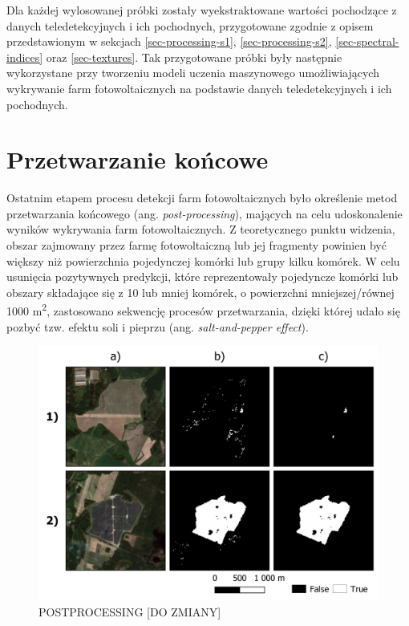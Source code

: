 \documentclass{amuthesis}
\begin{document}
Dla każdej wylosowanej próbki zostały wyekstraktowane wartości
pochodzące z danych teledetekcyjnych i ich pochodnych, przygotowane
zgodnie z opisem przedstawionym w sekcjach \ref{sec-processing-s1},
\ref{sec-processing-s2}, \ref{sec-spectral-indices} oraz
\ref{sec-textures}. Tak przygotowane próbki były następnie wykorzystane
przy tworzeniu modeli uczenia maszynowego umożliwiających wykrywanie
farm fotowoltaicznych na podstawie danych teledetekcyjnych i ich
pochodnych.

\hypertarget{przetwarzanie-koux144cowe}{%
\section{Przetwarzanie końcowe}\label{przetwarzanie-koux144cowe}}

Ostatnim etapem procesu detekcji farm fotowoltaicznych było określenie
metod przetwarzania końcowego (ang. \emph{post-processing}), mających na
celu udoskonalenie wyników wykrywania farm fotowoltaicznych. Z
teoretycznego punktu widzenia, obszar zajmowany przez farmę
fotowoltaiczną lub jej fragmenty powinien być większy niż powierzchnia
pojedynczej komórki lub grupy kilku komórek. W celu usunięcia
pozytywnych predykcji, które reprezentowały pojedyncze komórki lub
obszary składające się z 10 lub mniej komórek, o powierzchni
mniejszej/równej 1000 m\textsuperscript{2}, zastosowano sekwencję
procesów przetwarzania, dzięki której udało się pozbyć tzw. efektu soli
i pieprzu (ang. \emph{salt-and-pepper effect}).

\begin{figure}[t]

{\centering \includegraphics[width=1\textwidth,height=\textheight]{figures/postprocessing.png}

}

\caption{\label{fig-rycina-post-processing}POSTPROCESSING {[}DO
ZMIANY{]}}

\end{figure}
\end{document}
